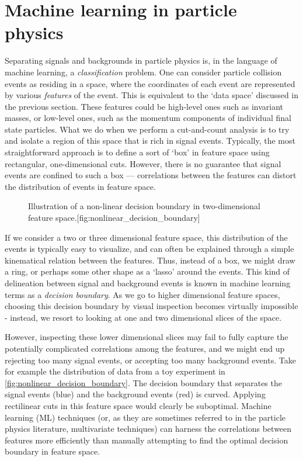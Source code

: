\section{Machine learning in particle physics}\label{sec:MachineLearning}
Separating signals and backgrounds in particle physics is, in the language of machine learning, a \emph{classification} problem. One can consider particle collision events as residing in a space, where the coordinates of each event are represented by various \emph{features} of the event. This is equivalent to the `data space' discussed in the previous section. These features could be high-level ones such as invariant masses, or low-level ones, such as the momentum components of individual final state particles. What we do when we perform a cut-and-count analysis is to try and isolate a region of this space that is rich in signal events. Typically, the most straightforward approach is to define a sort of `box' in feature space using rectangular, one-dimensional cuts. However, there is no guarantee that signal events are confined to such a box --- correlations between the features can distort the distribution of events in feature space. 
\strictpagecheck
\begin{figure}
  \begin{sidecaption}{Illustration of a non-linear decision boundary in two-dimensional feature space.}[fig:nonlinear_decision_boundary]
  
\end{sidecaption}
\end{figure}
If we consider a two or three dimensional feature space, this distribution of the events is typically easy to visualize, and can often be explained through a simple kinematical relation between the features. Thus, instead of a box, we might draw a ring, or perhaps some other shape as a `lasso' around the events. This kind of delineation between signal and background events is known in machine learning terms as a \emph{decision boundary}. As we go to higher dimensional feature spaces, choosing this decision boundary by visual inspection becomes virtually impossible - instead, we resort to looking at one and two dimensional slices of the space. 

However, inspecting these lower dimensional slices may fail to fully capture the potentially complicated correlations among the features, and we might end up rejecting too many signal events, or accepting too many background events. Take for example the distribution of data from a toy experiment in \autoref{fig:nonlinear_decision_boundary}. The decision boundary that separates the signal events (blue) and the background events (red) is curved. Applying rectilinear cuts in this feature space would clearly be suboptimal. Machine learning (ML) techniques (or, as they are sometimes referred to in the particle physics literature, multivariate techniques) can harness the correlations between features more efficiently than manually attempting to find the optimal decision boundary in feature space.

